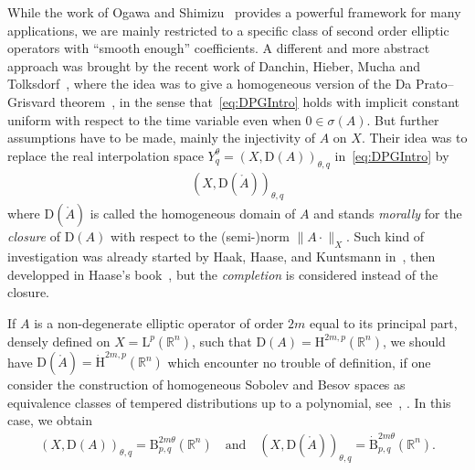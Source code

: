 \documentclass[AHL,Unicode,longabstracts,published]{cedram}
\newcommand{\bbR}{\mathbb{R}}
\newcommand{\rmH}{\mathrm{H}}%
\newcommand{\rmB}{\mathrm{B}}
\newcommand{\rmD}{\mathrm{D}}
\newcommand{\rmL}{\mathrm{L}}
\newcommand{\rgA}{\mathring{A}}
\begin{document}
While the work of Ogawa and Shimizu~\cite{OgawaShimizu2022} provides a powerful framework for many applications, we are mainly restricted to a specific class of second order elliptic operators with ``smooth enough'' coefficients. A different and more abstract approach was brought by the recent work of Danchin, Hieber, Mucha and Tolksdorf~\cite{DanchinHieberMuchaTolk2020}, where the idea was to give a homogeneous version of the Da Prato--Grisvard theorem~\cite[Theorem~4.15]{DaPratoGrisvard1975}, in the sense that~\eqref{eq:DPGIntro} holds with implicit constant uniform with respect to the time variable even when $0\in\sigma(A)$. But further assumptions have to be made, mainly the injectivity of $A$ on $X$. Their idea was to replace the real interpolation space $Y^{\theta}_q=(X,\rmD(A))_{\theta,q}$ in~\eqref{eq:DPGIntro} by
\begin{align*}
\left(X,\rmD(\rgA)\right)_{\theta,q}
\end{align*}
where $\rmD(\rgA)$ is called the homogeneous domain of $A$ and stands \emph{morally} for the \emph{closure} of $\rmD(A)$ with respect to the (semi-)norm $\| A \cdot \|_X$. Such kind of investigation was already started by Haak, Haase, and Kuntsmann in~\cite{HaakHaaseKunstmann2006}, then developped in Haase's book~\cite[Chapter~6]{bookHaase2006}, but the \emph{completion} is considered instead of the closure.

If $A$ is a non-degenerate elliptic operator of order $2m$ equal to its principal part, densely defined on $X=\rmL^{p}(\bbR^n)$, such that $\rmD({A})=\rmH^{2m,p}(\bbR^n)$, we should have $\rmD(\rgA)=\dot{\rmH}^{2m,p}(\bbR^n)$ which encounter no trouble of definition, if one consider the construction of homogeneous Sobolev and Besov spaces as equivalence classes of tempered distributions up to a polynomial, see~\cite[Chapter~8,~Section~3]{bookHaase2006}, \cite[Chapter~5]{bookTriebel1983}. In this case, we obtain
\begin{align*}
(X,\rmD({A}))_{\theta,q} = {\rmB}^{2m\theta}_{p,q}\left(\bbR^n\right) \quad\text{and}\quad \left(X,\rmD(\rgA)\right)_{\theta,q} = \dot{\rmB}^{2m\theta}_{p,q}\left(\bbR^n\right) .
\end{align*}
\end{document}
